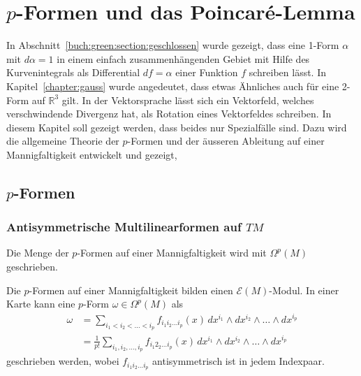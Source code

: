%
%
%
\chapter{$p$-Formen und das Poincaré-Lemma
\label{chapter:pformen}}
In Abschnitt~\ref{buch:green:section:geschlossen} wurde gezeigt, dass eine
1-Form $\alpha$ mit $d\alpha=1$ in einem einfach zusammenhängenden Gebiet
mit Hilfe des Kurvenintegrals als Differential $df=\alpha$ einer Funktion
$f$ schreiben lässt.
In Kapitel~\ref{chapter:gauss} wurde angedeutet, dass etwas Ähnliches auch
für eine 2-Form auf $\mathbb{R}^3$ gilt.
In der Vektorsprache lässt sich ein Vektorfeld, welches verschwindende
Divergenz hat, als Rotation eines Vektorfeldes schreiben.
In diesem Kapitel soll gezeigt werden, dass beides nur Spezialfälle sind.
Dazu wird die allgemeine Theorie der $p$-Formen und der äusseren Ableitung
auf einer Mannigfaltigkeit entwickelt und gezeigt, 

%
%
\section{$p$-Formen
\label{buch:pformen:section:pformen}}


%
%
\subsection{Antisymmetrische Multilinearformen auf $TM$}

\begin{definition}
Die Menge der $p$-Formen auf einer Mannigfaltigkeit wird mit $\Omega^p(M)$
geschrieben.
\end{definition}

\begin{satz}
Die $p$-Formen auf einer Mannigfaltigkeit bilden einen $\mathscr{E}(M)$-Modul.
In einer Karte kann eine $p$-Form $\omega\in \Omega^p(M)$ als
\begin{align*}
\omega
&=
\sum_{i_1<i_2<\dots< i_p}
f_{i_1 i_2\dots i_p}(x)
\, dx^{i_1}\wedge dx^{i_2}\wedge\dots\wedge dx^{i_p}
\\
&=
\frac{1}{p!}
\sum_{i_1,i_2,\dots,i_p}
f_{i_1 2_2\dots i_p}(x)
\, dx^{i_1}\wedge dx^{i_2}\wedge\dots\wedge dx^{i_p}
\end{align*}
geschrieben werden, wobei $f_{i_1 i_2\dots i_p}$  antisymmetrisch ist in jedem
Indexpaar.
\end{satz}

